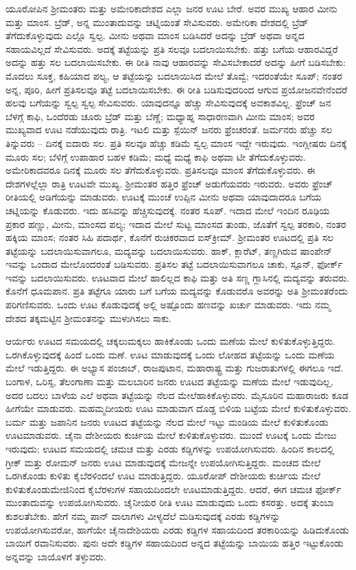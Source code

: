 ಯೂರೋಪಿನ ಶ‍್ರೀಮಂತರು ಮತ್ತು ಅಮೇರಿಕಾದೇಶದ ಎಲ್ಲಾ ಜನರ ಊಟ ಬೇರೆ. ಅವರ ಮುಖ್ಯ ಆಹಾರ ಮೀನು ಮತ್ತು ಮಾಂಸ. ಬ್ರೆಡ್​, ಅನ್ನ ಮುಂತಾದುವನ್ನು ಚಟ್ನಿಯಂತೆ ಸೇವಿಸುವರು. ಅಮೇರಿಕಾ ದೇಶದಲ್ಲಿ ಬ್ರೆಡ್​ ತೆಗೆದುಕೊಳ್ಳುವುದು ಎಲ್ಲೊ ಸ್ವಲ್ಪ. ಮೀನು ಅಥವಾ ಮಾಂಸ ಬಡಿಸಿದರೆ ಅದನ್ನು ಬ್ರೆಡ್​ ಅಥವಾ ಅನ್ನದ ಸಹಾಯವಿಲ್ಲದೆ ಸೇವಿಸುವರು. ಅದಕ್ಕೆ ತಟ್ಟೆಯನ್ನು ಪ್ರತಿ ಸಲವೂ ಬದಲಾಯಿಸಬೇಕು. ಹತ್ತು ಬಗೆಯ ಆಹಾರವಿದ್ದರೆ ಅದನ್ನು ಹತ್ತು ಸಲ ಬದಲಾಯಿಸಬೇಕು. ಈ ರೀತಿ ನಾವು ಆಹಾರವನ್ನು ಸೇವಿಸಬೇಕಾದರೆ ಅದನ್ನು ಹೀಗೆ ಬಡಿಸಬೇಕು: ಮೊದಲು ಸೂಕ್ತ, ಕಹಿಯಾದ ಪಲ್ಯ, ಆ ತಟ್ಟೆಯನ್ನು ಬದಲಾಯಿಸಿದ ಮೇಲೆ ತೊವ್ವೆ; ಇದರಂತೆಯೇ ಸೂಪ್​; ನಂತರ ಅನ್ನ, ಪೂರಿ, ಹೀಗೆ ಪ್ರತಿಸಲವೂ ತಟ್ಟೆ ಬದಲಾಯಿಸಬೇಕು. ಈ ರೀತಿ ಬಡಿಸುವುದರಿಂದ ಆಗುವ ಪ್ರಯೋಜನವೇನೆಂದರೆ ಹಲವು ಬಗೆಯನ್ನು ಸ್ವಲ್ಪ ಸ್ವಲ್ಪ ಸೇವಿಸುವರು. ಯಾವುದನ್ನೂ ಹೆಚ್ಚು ಸೇವಿಸುವುದಕ್ಕೆ ಅವಕಾಶವಿಲ್ಲ. ಫ್ರೆಂಚ್​ ಜನ ಬೆಳಗ್ಗೆ ಕಾಫಿ, ಒಂದೆರಡು ಚೂರು ಬ್ರೆಡ್​ ಮತ್ತು ಬೆಣ್ಣೆ; ಮಧ್ಯಾಹ್ನ ಸಾಧಾರಣವಾಗಿ ಮೀನು ಮಾಂಸ; ಅವರ ಮುಖ್ಯವಾದ ಊಟ ನಡೆಯುವುದು ರಾತ್ರಿ. ಇಟಲಿ ಮತ್ತು ಸ್ಪೆಯಿನ್​ ಜನರು ಫ್ರೆಂಚರಂತೆ. ಜರ್ಮನರು ಹೆಚ್ಚು ಸಲ ತಿನ್ನುವರು – ದಿನಕ್ಕೆ ಐದಾರು ಸಲ. ಪ್ರತಿ ಸಲವೂ ಹೆಚ್ಚು ಕಡಿಮೆ ಸ್ವಲ್ಪ ಮಾಂಸ ಇದ್ದೇ ಇರುವುದು. ಇಂಗ್ಲೀಷರು ದಿನಕ್ಕೆ ಮೂರು ಸಲ; ಬೆಳಿಗ್ಗೆ ಉಪಾಹಾರ ಬಹಳ ಕಡಿಮೆ; ಮಧ್ಯೆ ಮಧ್ಯೆ ಕಾಫಿ ಅಥವಾ ಟೀ ತೆಗೆದುಕೊಳ್ಳುವರು. ಅಮೇರಿಕಾದವರೂ ದಿನಕ್ಕೆ ಮೂರು ಸಲ ತೆಗೆದುಕೊಳ್ಳುವರು. ಪ್ರತಿಸಲವೂ ಮಾಂಸ ತೆಗೆದುಕೊಳ್ಳುವರು. ಈ ದೇಶಗಳಲ್ಲೆಲ್ಲಾ ರಾತ್ರಿ ಊಟವೇ ಮುಖ್ಯ. ಶ‍್ರೀಮಂತರ ಹತ್ತಿರ ಫ್ರೆಂಚ್​ ಅಡುಗೆಯವರು ಇರುವರು. ಅವರು ಫ್ರೆಂಚ್ ರೀತಿಯಲ್ಲಿ ಅಡಿಗೆಯನ್ನು ಮಾಡುವರು. ಊಟಕ್ಕೆ ಮುಂಚೆ ಉಪ್ಪಿನ ಮೀನು ಅಥವಾ ಯಾವುದಾದರೂ ಬಗೆಯ ಚಟ್ನಿಯನ್ನು ಕೊಡುವರು. ಇದು ಹಸಿವನ್ನು ಹೆಚ್ಚಿಸುವುದಕ್ಕೆ. ನಂತರ ಸೂಪ್​. ಇದಾದ ಮೇಲೆ ಇಂದಿನ ರೂಢಿಯ ಪ್ರಕಾರ ಹಣ್ಣು, ಮೀನು, ಮಾಂಸದ ಪಲ್ಯ; ಇದಾದ ಮೇಲೆ ಸುಟ್ಟ ಮಾಂಸದ ತುಂಡು, ಜೊತೆಗೆ ಸ್ವಲ್ಪ ತರಕಾರಿ, ನಂತರ ಹಕ್ಕಿಯ ಮಾಂಸ; ನಂತರ ಸಿಹಿ ಪದಾರ್ಥ, ಕೊನೆಗೆ ರುಚಿಕರವಾದ ಐಸ್​ಕ್ರೀಮ್​. ಶ‍್ರೀಮಂತರ ಊಟದಲ್ಲಿ ಪ್ರತಿ ಸಲ ತಟ್ಟೆಯನ್ನು ಬದಲಾಯಿಸುವಾಗಲೂ, ಮದ್ಯವನ್ನು ಬದಲಾಯಿಸುವರು. ಹಾಕ್​, ಕ್ಲಾರೆಟ್​, ತಣ್ಣಗಿರುವ ಷಾಂಪೇನ್​ ಇವನ್ನು ಒಂದಾದ ಮೇಲೊಂದರಂತೆ ಬಡಿಸುವರು. ಪ್ರತಿಸಲ ತಟ್ಟೆ ಬದಲಾಯಿಸುವಾಗಲೂ ಚಾಕು, ಸ್ಪೂನ್​, ಫೋರ್ಕ್​ ಇವನ್ನು ಬದಲಾಯಿಸುವರು. ಊಟವಾದ ಮೇಲೆ ಹಾಲಿಲ್ಲದ ಕಾಫಿ ಮತ್ತು ಅತಿ ಸಣ್ಣ ಗ್ಲಾಸಿನಲ್ಲಿ ಮದ್ಯವನ್ನು ತರುವರು. ಕೊನೆಗೆ ಧೂಮಪಾನ. ಪ್ರತಿ ತಟ್ಟೆಗೂ ಯಾರು ಬಗೆ ಬಗೆಯ ಮದ್ಯವನ್ನು ಕೊಡುವರೊ ಅವರನ್ನು ಅತಿ ಶ‍್ರೀಮಂತರೆಂದು ಪರಿಗಣಿಸುವರು. ಒಂದು ಊಟ ಕೊಡುವುದಕ್ಕೆ ಅಲ್ಲಿ ಅಷ್ಟೊಂದು ಹಣವನ್ನು ಖರ್ಚು ಮಾಡುವರು. ಇದು ನಮ್ಮ ದೇಶದ ತಕ್ಕಮಟ್ಟಿನ ಶ‍್ರೀಮಂತನನ್ನು ಮುಳುಗಿಸಲು ಸಾಕು.

ಆರ್ಯರು ಊಟದ ಸಮಯದಲ್ಲಿ ಚಕ್ಕಲುಮಕ್ಕಲು ಹಾಕಿಕೊಂಡು ಒಂದು ಮಣೆಯ ಮೇಲೆ ಕುಳಿತುಕೊಳ್ಳುತ್ತಿದ್ದರು. ಒರಗಿಕೊಳ್ಳುವುದಕ್ಕೆ ಹಿಂದೆ ಒಂದು ಮಣೆ. ಊಟ ಮಾಡುವುದಕ್ಕೆ ಒಂದು ಲೋಹದ ತಟ್ಟೆಯನ್ನು ಒಂದು ಮಣೆಯ ಮೇಲೆ ಇಡುತ್ತಿದ್ದರು. ಈ ಅಭ್ಯಾಸ ಪಂಜಾಬ್​, ರಾಜಪುಟಾನ, ಮಹಾರಾಷ್ಟ್ರ ಮತ್ತು ಗುಜರಾತುಗಳಲ್ಲಿ ಈಗಲೂ ಇದೆ. ಬಂಗಾಳ, ಒರಿಸ್ಸ, ತೆಲಂಗಾಣಾ ಮತ್ತು ಮಲಬಾರಿನ ಜನರು ಊಟದ ತಟ್ಟೆಯನ್ನು ಮಣೆಯ ಮೇಲೆ ಇಡುವುದಿಲ್ಲ, ಅದರ ಬದಲು ಬಾಳೆಯ ಎಲೆ ಅಥವಾ ತಟ್ಟೆಯನ್ನು ನೆಲದ ಮೇಲೆಹಾಕಿಕೊಳ್ಳುವರು. ಮೈಸೂರಿನ ಮಹಾರಾಜರು ಕೂಡ ಹೀಗೆಯೇ ಮಾಡುವರು. ಮಹಮ್ಮದೀಯರು ಊಟ ಮಾಡುವಾಗ ದೊಡ್ಡ ಬಿಳಿಯ ಬಟ್ಟೆಯ ಮೇಲೆ ಕುಳಿತುಕೊಳ್ಳುವರು. ಬರ್ಮ ಮತ್ತು ಜಪಾನಿನ ಜನರು ಊಟದ ತಟ್ಟೆಯನ್ನು ನೆಲದ ಮೇಲೆ ಇಟ್ಟು ಮಂಡಿಯ ಮೇಲೆ ಕುಳಿತುಕೊಂಡು ಊಟಮಾಡುವರು. ಚೈನಾ ದೇಶೀಯರು ಕುರ್ಚಿಯ ಮೇಲೆ ಕುಳಿತುಕೊಳ್ಳುವರು. ಮುಂದೆ ಊಟಕ್ಕೆ ಒಂದು ಮೇಜು ಇರುವುದು; ಊಟದ ಸಮಯದಲ್ಲಿ ಚಮಚ ಮತ್ತು ಎರಡು ಕಡ್ಡಿಗಳನ್ನು ಉಪಯೋಗಿಸುವರು. ಹಿಂದಿನ ಕಾಲದಲ್ಲಿ ಗ್ರೀಕ್​ ಮತ್ತು ರೋಮನ್​ ಜನರು ಊಟ ಮಾಡುವುದಕ್ಕೆ ಮೇಜನ್ನೇ ಉಪಯೋಗಿಸುತ್ತಿದ್ದರು. ಮಂಚದ ಮೇಲೆ ಒರಗಿಕೊಂಡು ಕುಳಿತು ಕೈಬೆರಳಿಂದಲೆ ಊಟ ಮಾಡುತ್ತಿದ್ದರು. ಯೂರೋಪ್​ ದೇಶೀಯರು ಕುರ್ಚಿಯ ಮೇಲೆ ಕುಳಿತುಕೊಂಡು\break ಮೇಜಿನಿಂದ ಕೈಬೆರಳುಗಳ ಸಹಾಯದಿಂದಲೇ ಊಟಮಾಡುತ್ತಿದ್ದರು. ಆದರೆ, ಈಗ ಚಮಚ ಫೋರ್ಕ್​ ಮುಂತಾದುವನ್ನು ಉಪಯೋಗಿಸುವರು. ಚೈನೀಯರ ರೀತಿ ಊಟ ಮಾಡುವುದು ಒಂದು ಕಸರತ್ತು. ಅದಕ್ಕೆ ತುಂಬಾ ಕುಶಲತೆಬೇಕು. ಹೇಗೆ ನಮ್ಮ ಪಾನ್ ವಾಲಾಗಳು ವೀಳ್ಯದೆಲೆ ಮಡಿಸುವುದಕ್ಕೆ ಎರಡು ಕಡ್ಡಿಗಳನ್ನು ಉಪಯೋಗಿಸುವರೋ, ಹಾಗೆಯೇ ಚೈನಾದೇಶಿಯರು ಎರಡು ಕಡ್ಡಿಗಳ ಸಹಾಯದಿಂದ ತರಕಾರಿಯನ್ನು ಹಿಡಿದುಕೊಂಡು ಬಾಯಿಗೆ ರವಾನಿಸುವರು. ಪುನಃ ಅದೇ ಕಡ್ಡಿಗಳ ಸಹಾಯದಿಂದ ಅನ್ನದ ತಟ್ಟೆಯನ್ನು ಬಾಯಿಯ ಹತ್ತಿರ ಇಟ್ಟುಕೊಂಡು ಅನ್ನವನ್ನು ಬಾಯೊಳಗೆ ತಳ್ಳುವರು.

